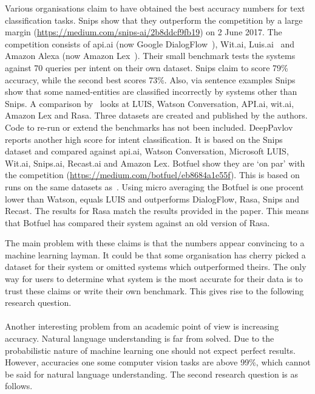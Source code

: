 Various organisations claim to have obtained the best accuracy numbers for text classification tasks.
Snips show that they outperform the competition by a large margin (\url{https://medium.com/snips-ai/2b8ddcf9fb19}) on 2 June 2017.
The competition consists of api.ai (now Google DialogFlow~\citep{google2019dialogflow}), Wit.ai, Luis.ai~\citep{microsoft2019luis} and Amazon Alexa (now Amazon Lex~\citep{amazon2019lex}).
Their small benchmark tests the systems against 70 queries per intent on their own dataset.
Snips claim to score 79\% accuracy, while the second best scores 73\%.
Also, via sentence examples Snips show that some named-entities are classified incorrectly by systems other than Snips.
A comparison by~\citet{braun2017} looks at LUIS, Watson Conversation, API.ai, wit.ai, Amazon Lex and Rasa.
Three datasets are created and published by the authors.
Code to re-run or extend the benchmarks has not been included.
DeepPavlov~\citep{burtsev2018} reports another high score for intent classification.
It is based on the Snips dataset and compared against api.ai, Watson Conversation, Microsoft LUIS, Wit.ai, Snips.ai, Recast.ai and Amazon Lex.
Botfuel show they are `on par' with the competition (\url{https://medium.com/botfuel/eb8684a1e55f}).
This is based on runs on the same datasets as~\citet{braun2017}.
Using micro averaging the Botfuel is one procent lower than Watson, equals LUIS and outperforms DialogFlow, Rasa, Snips and Recast.
The results for Rasa match the results provided in the paper.
This means that Botfuel has compared their system against an old version of Rasa.

The main problem with these claims is that the numbers appear convincing to a machine learning layman.
It could be that some organisation has cherry picked a dataset for their system or omitted systems which outperformed theirs.
The only way for users to determine what system is the most accurate for their data is to trust these claims or write their own benchmark.
This gives rise to the following research question.\\

\rqone \\[1mm]

Another interesting problem from an academic point of view is increasing accuracy.
Natural language understanding is far from solved.
Due to the probabilistic nature of machine learning one should not expect perfect results.
However, accuracies one some computer vision tasks are above 99\%, which cannot be said for natural language understanding.
The second research question is as follows.\\

